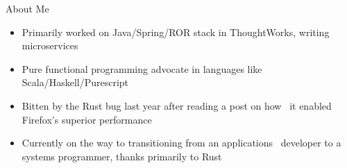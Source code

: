 \begin{frame}{About Me}
  \begin{itemize}
  \item Primarily worked on Java/Spring/ROR stack in ThoughtWorks, writing microservices
  \item Pure functional programming advocate in languages like Scala/Haskell/Purescript
  \item Bitten by the Rust bug last year after reading a post on how \
    it enabled Firefox's superior performance
  \item Currently on the way to transitioning from an applications \
    developer to a systems programmer, thanks primarily to Rust
  \end{itemize}
\end{frame}
